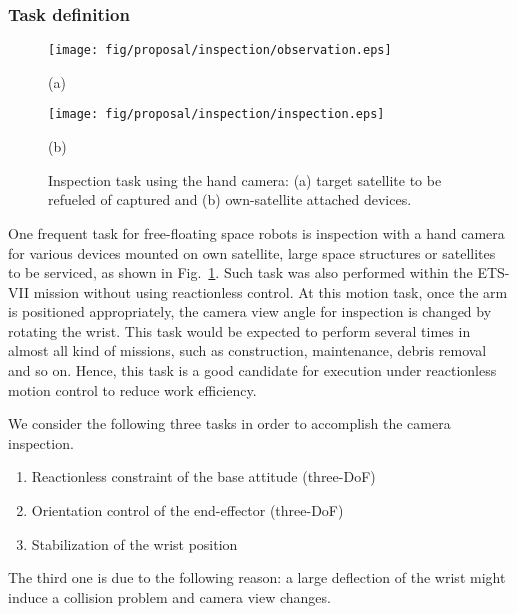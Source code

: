 \documentclass[preprint,12pt]{elsarticle}
\def\fig#1{{Fig.~\ref{fig:#1}}}
\begin{document}
\subsubsection{Task definition}
\label{sec:MISSION}

%
\begin{figure}[t]
  \centering
  \begin{minipage}[h]{0.495\linewidth}
    \centering
    \texttt{[image: fig/proposal/inspection/observation.eps]}
    \footnotesize\par{(a)}
  \end{minipage}
  \begin{minipage}[h]{0.495\linewidth}
    \centering
    \texttt{[image: fig/proposal/inspection/inspection.eps]}
    \footnotesize\par{(b)}
  \end{minipage}
  \caption{Inspection task using the hand camera: 
    (a) target satellite to be refueled of captured and (b) own-satellite attached devices.}
  \label{fig:ins}
\end{figure}
%
One frequent task for free-floating space robots is inspection with a hand camera for various devices mounted
on own satellite, large space structures or satellites to be serviced, as shown in \fig{ins}.
Such task was also performed within the ETS-VII mission \cite{Oda1997} without using reactionless control.
At this motion task, once the arm is positioned appropriately,
the camera view angle for inspection is changed by rotating the wrist.
This task would be expected to perform several times in almost all kind of missions,
such as construction, maintenance, debris removal and so on.
Hence, this task is a good candidate for execution under reactionless motion control
to reduce work efficiency.

We consider the following three tasks in order to accomplish the camera inspection.
%
\begin{enumerate}
\item Reactionless constraint of the base attitude (three-DoF)
\item Orientation control of the end-effector (three-DoF)
\item Stabilization of the wrist position
\end{enumerate}
%
The third one is due to the following reason:
a large deflection of the wrist
might induce a collision problem and camera view changes.
\end{document}
